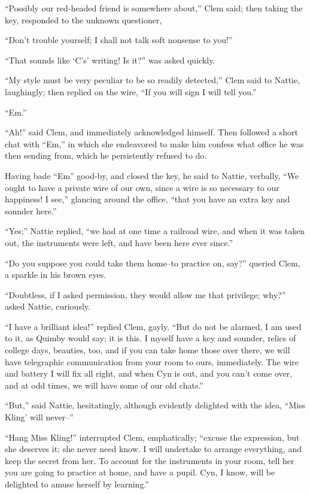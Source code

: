 ``Possibly our red-headed friend is somewhere about,'' Clem said; then
taking the key, responded to the unknown questioner,

``Don't trouble yourself; I shall not talk soft nonsense to you!''

``That sounds like `C's' writing! Is it?'' was asked quickly.

``My style must be very peculiar to be so readily detected,'' Clem said to
Nattie, laughingly; then replied on the wire, ``If you will sign I will
tell you.''

``Em.''

``Ah!'' said Clem, and immediately acknowledged himself. Then followed a
short chat with ``Em,'' in which she endeavored to make him confess what
office he was then sending from, which he persistently refused to do.

Having bade ``Em'' good-by, and closed the key, he said to Nattie,
verbally, ``We ought to have a private wire of our own, since a wire is
so necessary to our happiness! I see,'' glancing around the office, ``that
you have an extra key and sounder here.''

``Yes;'' Nattie replied, ``we had at one time a railroad wire, and when it
was taken out, the instruments were left, and have been here ever
since.''

``Do you suppose you could take them home--to practice on, say?'' queried
Clem, a sparkle in his brown eyes.

``Doubtless, if I asked permission, they would allow me that privilege;
why?'' asked Nattie, curiously.

``I have a brilliant idea!'' replied Clem, gayly. ``But do not be alarmed,
I am used to it, as Quimby would say; it is this. I myself have a key
and sounder, relics of college days, beauties, too, and if you can take
home those over there, we will have telegraphic communication from your
room to ours, immediately. The wire and battery I will fix all right,
and when Cyn is out, and you can't come over, and at odd times, we will
have some of our old chats.''

``But,'' said Nattie, hesitatingly, although evidently delighted with the
idea, ``Miss Kling' will never--''

``Hang Miss Kling!'' interrupted Clem, emphatically; ``excuse the
expression, but she deserves it; she never need know. I will undertake
to arrange everything, and keep the secret from her. To account for the
instruments in your room, tell her you are going to practice at home,
and have a pupil. Cyn, I know, will be delighted to amuse herself by
learning.''

